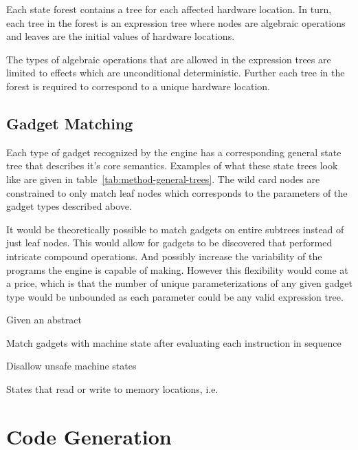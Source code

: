     Each state forest contains a tree for each affected hardware location.  In
    turn, each tree in the forest is an expression tree where nodes are
    algebraic operations and leaves are the initial values of hardware
    locations.

    The types of algebraic operations that are allowed in the expression trees
    are limited to effects which are unconditional deterministic. Further each
    tree in the forest is required to correspond to a unique hardware location.

    
    \subsection{Gadget Matching}

    Each type of gadget recognized by the engine has a corresponding general
    state tree that describes it's core semantics. Examples of what these
    state trees look like are given in table~\ref{tab:method-general-trees}. The
    wild card nodes are constrained to only match leaf nodes which corresponds
    to the parameters of the gadget types described above.

    It would be theoretically possible to match gadgets on entire subtrees
    instead of just leaf nodes. This would allow for gadgets to be discovered
    that performed intricate compound operations. And possibly increase the
    variability of the programs the engine is capable of making. However this
    flexibility would come at a price, which is that the number of unique
    parameterizations of any given gadget type would be unbounded as each
    parameter could be any valid expression tree.


    Given an abstract


                    Match gadgets with machine state after evaluating each
                    instruction in sequence

                        Disallow unsafe machine states

                        States that read or write to memory locations, i.e.
     
    \section{Code Generation}

